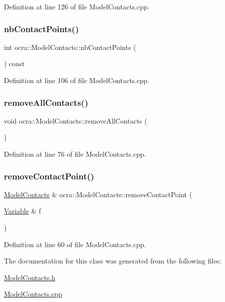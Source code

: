 Definition at line 126 of file Model\+Contacts.\+cpp.

\hypertarget{classocra_1_1ModelContacts_ab06a70136062c53c28344ce471f0bd73}{}\label{classocra_1_1ModelContacts_ab06a70136062c53c28344ce471f0bd73} 
\subsubsection{\texorpdfstring{nb\+Contact\+Points()}{nbContactPoints()}}
{\footnotesize\ttfamily int ocra\+::\+Model\+Contacts\+::nb\+Contact\+Points (\begin{DoxyParamCaption}{ }\end{DoxyParamCaption}) const}



Definition at line 106 of file Model\+Contacts.\+cpp.

\hypertarget{classocra_1_1ModelContacts_ad633a3df5915ee16b3a55b8169e4006e}{}\label{classocra_1_1ModelContacts_ad633a3df5915ee16b3a55b8169e4006e} 
\subsubsection{\texorpdfstring{remove\+All\+Contacts()}{removeAllContacts()}}
{\footnotesize\ttfamily void ocra\+::\+Model\+Contacts\+::remove\+All\+Contacts (\begin{DoxyParamCaption}{ }\end{DoxyParamCaption})}



Definition at line 76 of file Model\+Contacts.\+cpp.

\hypertarget{classocra_1_1ModelContacts_a4e2267a563e01c78c9aff1fced5cb83b}{}\label{classocra_1_1ModelContacts_a4e2267a563e01c78c9aff1fced5cb83b} 
\subsubsection{\texorpdfstring{remove\+Contact\+Point()}{removeContactPoint()}}
{\footnotesize\ttfamily \hyperlink{classocra_1_1ModelContacts}{Model\+Contacts} \& ocra\+::\+Model\+Contacts\+::remove\+Contact\+Point (\begin{DoxyParamCaption}\item[{\hyperlink{classocra_1_1Variable}{Variable} \&}]{f }\end{DoxyParamCaption})}



Definition at line 60 of file Model\+Contacts.\+cpp.



The documentation for this class was generated from the following files\+:\begin{DoxyCompactItemize}
\item 
\hyperlink{ModelContacts_8h}{Model\+Contacts.\+h}\item 
\hyperlink{ModelContacts_8cpp}{Model\+Contacts.\+cpp}\end{DoxyCompactItemize}
